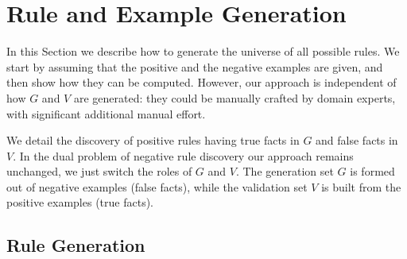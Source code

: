 \section{\hspace{-1.5ex} Rule and Example Generation} \label{sec:rules_gen}
In this Section we describe how to generate the universe of all possible rules. 
We start by assuming that the positive and the negative examples are given, and then show how they can be computed. However, our approach is independent of how $G$ and $V$ are generated: they could be manually crafted by domain experts, with significant additional manual effort.

We detail the discovery of positive rules having true facts in $G$ and false facts in $V$.
In the dual problem of negative rule discovery our approach remains unchanged, we just switch the roles of $G$ and $V$. The generation set $G$ is formed out of negative examples (false facts), while the validation set $V$ is built from the positive examples (true facts). 


\vspace{-1ex}	
\subsection{Rule Generation} \label{sec:rules_generation}
\vspace{-0.2ex}	

